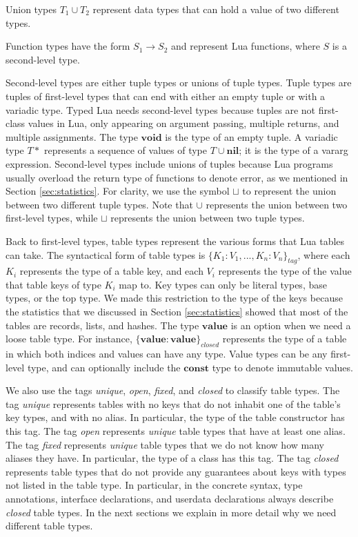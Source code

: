 \documentclass{sigplanconf}
\newcommand{\Value}{\mathbf{value}}
\newcommand{\Nil}{\mathbf{nil}}
\newcommand{\Void}{\mathbf{void}}
\newcommand{\Const}{\mathbf{const}}
\begin{document}
Union types $T_{1} \cup T_{2}$ represent data types that can hold a value
of two different types.

Function types have the form $S_{1} \rightarrow S_{2}$ and represent Lua functions,
where $S$ is a second-level type.

Second-level types are either tuple types or unions of tuple types.
Tuple types are tuples of first-level types that can end with
either an empty tuple or with a variadic type.
Typed Lua needs second-level types because tuples are not first-class
values in Lua, only appearing on argument passing, multiple returns,
and multiple assignments.
The type $\Void$ is the type of an empty tuple.
A variadic type $T{*}$ represents a sequence of values of type $T \cup \Nil$;
it is the type of a vararg expression.
Second-level types include unions of tuples because Lua programs
usually overload the return type of functions to denote error,
as we mentioned in Section \ref{sec:statistics}.
For clarity, we use the symbol $\sqcup$ to represent the union between
two different tuple types.
Note that $\cup$ represents the union between two first-level types,
while $\sqcup$ represents the union between two tuple types.

Back to first-level types, table types represent the various forms
that Lua tables can take.
The syntactical form of table types is $\{ K_{1}{:}V_{1}, ..., K_{n}{:}V_{n} \}_{tag}$,
where each $K_{i}$ represents the type of a table key,
and each $V_{i}$ represents the type of the value that table keys of type $K_{i}$ map to.
Key types can only be literal types, base types, or the top type.
We made this restriction to the type of the keys because the statistics
that we discussed in Section \ref{sec:statistics} showed that most
of the tables are records, lists, and hashes.
The type $\Value$ is an option when we need a loose table type.
For instance, $\{\Value:\Value\}_{closed}$ represents the type of a
table in which both indices and values can have any type.
Value types can be any first-level type, and can optionally include
the $\Const$ type to denote immutable values.

We also use the tags \emph{unique}, \emph{open}, \emph{fixed}, and \emph{closed}
to classify table types.
The tag \emph{unique} represents tables with no keys that do not
inhabit one of the table's key types, and with no alias.
In particular, the type of the table constructor has this tag.
The tag \emph{open} represents \emph{unique} table types that
have at least one alias.
The tag \emph{fixed} represents \emph{unique} table types that we
do not know how many aliases they have.
In particular, the type of a class has this tag.
The tag \emph{closed} represents table types that do not provide
any guarantees about keys with types not listed in the table type.
In particular, in the concrete syntax, type annotations, interface
declarations, and userdata declarations always describe \emph{closed} table types.
In the next sections we explain in more detail why we need
different table types.
\end{document}
